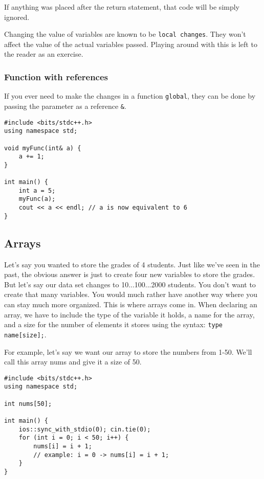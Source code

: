 \documentclass{report}
\begin{document}
If anything was placed after the return statement, that code will be simply ignored. 

\begin{note}
    Changing the value of variables are known to be \lstinline{local changes}. They won't affect the value of the actual variables passed. Playing around with this is left to the reader as an exercise. 
\end{note}

\subsubsection{Function with references}
If you ever need to make the changes in a function \lstinline{global}, they can be done by passing the parameter as a reference \lstinline{&}. 

\begin{lstlisting}[caption=Function with references]
#include <bits/stdc++.h>
using namespace std;

void myFunc(int& a) {
    a += 1;
}

int main() {
    int a = 5;
    myFunc(a);
    cout << a << endl; // a is now equivalent to 6
}
\end{lstlisting}

\subsection{Arrays}
Let's say you wanted to store the grades of 4 students. Just like we've seen in the past, the obvious answer is just to create four new variables to store the grades. But let's say our data set changes to 10...100...2000 students. You don't want to create that many variables. You would much rather have another way where you can stay much more organized. This is where arrays come in. When declaring an array, we have to include the type of the variable it holds, a name for the array, and a size for the number of elements it stores using the syntax: \lstinline{type name[size];}.

For example, let's say we want our array to store the numbers from 1-50. We'll call this array nums and give it a size of 50.

\begin{lstlisting}[caption=Array Example]
#include <bits/stdc++.h>
using namespace std;

int nums[50];

int main() {
    ios::sync_with_stdio(0); cin.tie(0);
    for (int i = 0; i < 50; i++) {
        nums[i] = i + 1;
        // example: i = 0 -> nums[i] = i + 1;
    }
}
\end{lstlisting}
\end{document}
